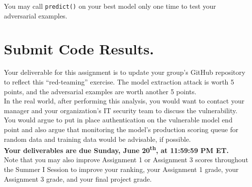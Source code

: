 \documentclass[fleqn]{article}
\begin{document}
\noindent You may call \texttt{predict()} on your best model only one time to test your adversarial examples.

\section{Submit Code Results.}

Your deliverable for this assignment is to update your group's GitHub repository to reflect this ``red-teaming'' exercise. The model extraction attack is worth 5 points, and the adversarial examples are worth another 5 points. \\

\noindent In the real world, after performing this analysis, you would want to contact your manager and your organization's IT security team to discuss the vulnerability. You would argue to put in place authentication on the vulnerable model end point and also argue that monitoring the model's production scoring queue for random data and training data would be advisable, if possible.\\

\noindent \textbf{Your deliverables are due Sunday, June 20\textsuperscript{th}, at 11:59:59 PM ET.}\\

\noindent Note that you may also improve Assignment 1 or Assignment 3 scores throughout the Summer I Session to improve your ranking, your Assignment 1 grade, your Assignment 3 grade, and your final project grade.
\end{document}
